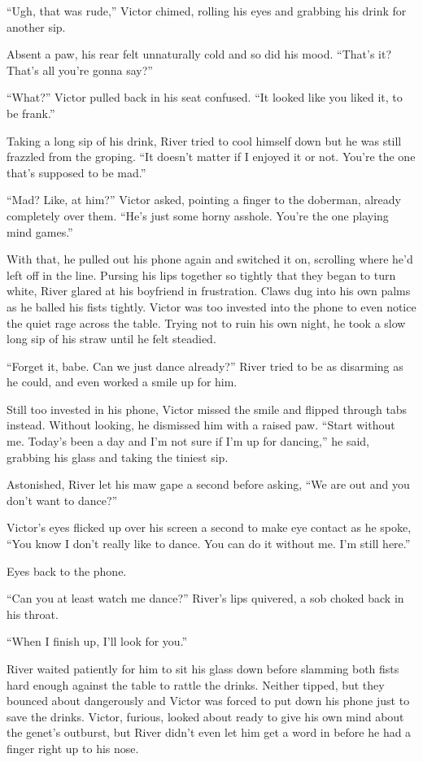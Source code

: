 ``Ugh, that was rude,'' Victor chimed, rolling his eyes and grabbing his
drink for another sip.

Absent a paw, his rear felt unnaturally cold and so did his mood.
``That's it? That's all you're gonna say?''

``What?'' Victor pulled back in his seat confused. ``It looked like you
liked it, to be frank.''

Taking a long sip of his drink, River tried to cool himself down but he
was still frazzled from the groping. ``It doesn't matter if I enjoyed it
or not. You're the one that's supposed to be mad.''

``Mad? Like, at him?'' Victor asked, pointing a finger to the doberman,
already completely over them. ``He's just some horny asshole. You're the
one playing mind games.''

With that, he pulled out his phone again and switched it on, scrolling
where he'd left off in the line. Pursing his lips together so tightly
that they began to turn white, River glared at his boyfriend in
frustration. Claws dug into his own palms as he balled his fists
tightly. Victor was too invested into the phone to even notice the quiet
rage across the table. Trying not to ruin his own night, he took a slow
long sip of his straw until he felt steadied.

``Forget it, babe. Can we just dance already?'' River tried to be as
disarming as he could, and even worked a smile up for him.

Still too invested in his phone, Victor missed the smile and flipped
through tabs instead. Without looking, he dismissed him with a raised
paw. ``Start without me. Today's been a day and I'm not sure if I'm up
for dancing,'' he said, grabbing his glass and taking the tiniest sip.

Astonished, River let his maw gape a second before asking, ``We are out
and you don't want to dance?''

Victor's eyes flicked up over his screen a second to make eye contact as
he spoke, ``You know I don't really like to dance. You can do it without
me. I'm still here.''

Eyes back to the phone.

``Can you at least watch me dance?'' River's lips quivered, a sob choked
back in his throat.

``When I finish up, I'll look for you.''

River waited patiently for him to sit his glass down before slamming
both fists hard enough against the table to rattle the drinks. Neither
tipped, but they bounced about dangerously and Victor was forced to put
down his phone just to save the drinks. Victor, furious, looked about
ready to give his own mind about the genet's outburst, but River didn't
even let him get a word in before he had a finger right up to his nose.

